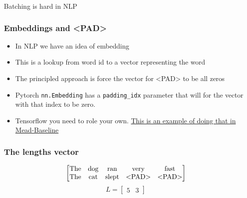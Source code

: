 \documentclass{beamer}
\begin{document}
\begin{section}{Batching is hard in NLP}
    \begin{frame}
        \frametitle{Embeddings and \textless PAD\textgreater}
        \begin{itemize}
            \item In NLP we have an idea of embedding
            \item This is a lookup from word id to a vector representing the word
            \item The principled approach is force the vector for \textless PAD\textgreater \hspace{1pt} to be all zeros
            \item Pytorch \texttt{nn.Embedding} has a \texttt{padding\_idx} parameter that will for the vector with
                    that index to be zero.
            \item Tensorflow you need to role your own.
                \href{https://github.com/dpressel/mead-baseline/blob/f98e64afcbab8a267fce5d13a434a981aa564d27/python/baseline/tf/tfy.py\#L656}{This is an example of doing that in Mead-Baseline}
        \end{itemize}
    \end{frame}

    \begin{frame}
        \frametitle{The lengths vector}

        $$
            \begin{bmatrix}
                \text{The} & \text{dog} & \text{ran} & \text{very} & \text{fast} \\
                \text{The} & \text{cat} & \text{slept} & \text{\textless PAD\textgreater} & \text{\textless PAD\textgreater}
            \end{bmatrix}
        $$
        $$
            L = \begin{bmatrix} 5 & 3 \end{bmatrix}
        $$


\end{frame}
\end{section}
\end{document}
